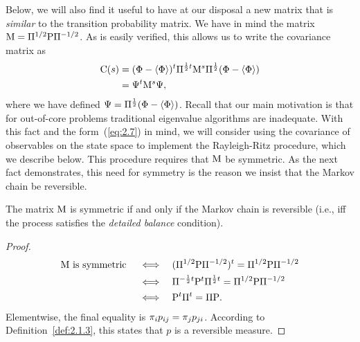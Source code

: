 Below, we will also find it useful to have at our disposal a new matrix that is \emph{similar} to the
transition probability matrix. We have in mind the matrix 
$\mathrm{M} = \Pi^{1/2}\mathrm{P}\Pi^{-1/2}$. 
As is easily verified, this allows us to write the covariance matrix as
\begin{align}
\label{eq:2.7}
\C(s) &= 
(\Phi - \<\Phi\>)^t \Pi^{\frac{1}{2}t}\M^s\Pi^{\frac{1}{2}}(\Phi - \<\Phi\>)\nonumber\\
&=\Psi^t \M^s \Psi,  %
\end{align}
where we have defined $\Psi = \Pi^{\frac{1}{2}}(\Phi - \langle\Phi\rangle)$. Recall that
our main motivation is that for out-of-core problems traditional eigenvalue
algorithms are inadequate. With this fact and the form~(\ref{eq:2.7}) %
in 
%
%
%
%
mind, we will consider using the covariance of observables on the state space to implement the
Rayleigh-Ritz procedure, which we describe below. This procedure requires
that $\mathrm{M}$ be symmetric. As the next fact demonstrates, 
this need for symmetry is the reason we insist that the Markov chain be reversible.
\begin{fact}
The matrix $\mathrm{M}$ is symmetric if and only if the Markov chain is reversible (i.e., iff the
process satisfies the \emph{detailed balance} condition).
\end{fact}
\begin{proof}
  \begin{align*}
  \mathrm{M} \text{ is symmetric } 
& \quad \Longleftrightarrow  \quad
 (\Pi^{1/2}\mathrm{P}\Pi^{-1/2})^t = \Pi^{1/2}\mathrm{P}\Pi^{-1/2}\\
& \quad \Longleftrightarrow  \quad
 \Pi^{-\frac{1}{2}t}\mathrm{P}^t\Pi^{\frac{1}{2}t} = \Pi^{1/2}\mathrm{P}\Pi^{-1/2}\\
& \quad \Longleftrightarrow  \quad
 \mathrm{P}^t\Pi^t = \Pi\mathrm{P}.
  \end{align*}
Elementwise, the final equality is $\pi_ip_{ij} = \pi_jp_{ji}$. 
According to Definition~\ref{def:2.1.3}, this states
that $p$ is a reversible measure.
\end{proof}


